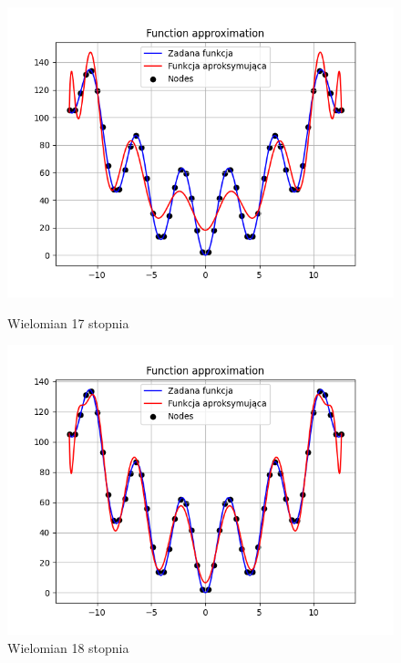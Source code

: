 \documentclass{article}
\begin{document}
\begin{figure}[H]
  \begin{minipage}[b]{0.49\textwidth}
    \begin{minipage}[b]{\textwidth}
      \includegraphics[width=\textwidth]{img26.png}
      \caption{Wielomian 17 stopnia}
    \end{minipage}
    \vspace*{\fill}
    \begin{minipage}[b]{\textwidth}
      \includegraphics[width=\textwidth]{img27.png}
      \caption{Wielomian 18 stopnia}
    \end{minipage}
  \end{minipage}
  \hfill
  \begin{minipage}[b]{0.49\textwidth}

\end{minipage}
\end{figure}
\end{document}
